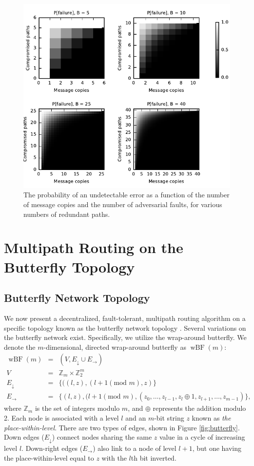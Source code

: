 \documentclass[prodmode,permissions]{acmsmall-ec16}
\newcommand{\beq}{\begin{eqnarray}}
\newcommand{\eeq}{\end{eqnarray}}
\DeclareMathOperator{\wbf}{wBF}
\begin{document}
\begin{figure}
\centerline{\includegraphics{fig-perror}}
\caption{
The probability of an undetectable error as a function of the number of
message copies and the number of adversarial faults,
for various numbers of redundant paths.
}
\label{fig:pfail}
\end{figure}

\section{Multipath Routing on the Butterfly Topology}

\subsection{Butterfly Network Topology}

We now present a decentralized, fault-tolerant, multipath routing algorithm
on a specific topology known as the butterfly network topology
\cite{kshemkalyani_distributed_2008}.
Several variations on the butterfly network exist.
Specifically, we utilize the wrap-around butterfly.
We denote the $m$-dimensional, directed wrap-around butterfly as $\wbf(m)$:
\beq
\wbf(m) &=& (V, E_\downarrow \cup E_\rightarrow) \\
V &=& \mathbb{Z}_{m} \times \mathbb{Z}_2^m \\
E_\downarrow
&=&
\{((l,z),(l+1 (\text{mod } m),z) \} \\
E_\rightarrow
&=&
\{(l,z),(l+1 (\text{mod } m),
(z_0, \ldots, z_{l-1},z_l \oplus 1, z_{l+1}, \ldots, z_{m-1}) \},
\eeq
where $\mathbb{Z}_m$ is the set of integers modulo $m$,
and $\oplus$ represents the addition modulo 2.
Each node is associated with a level $l$ and an $m$-bit string $z$
known as {\em the place-within-level}.
There are two types of edges, shown in Figure \ref{fig:butterfly}.
Down edges ($E_\downarrow$) connect nodes sharing the same $z$ value
in a cycle of increasing level $l$.
Down-right edges ($E_\rightarrow$) also link to a node of level $l + 1$,
but one having the place-within-level equal to $z$ with the $l$th bit inverted.
\end{document}
